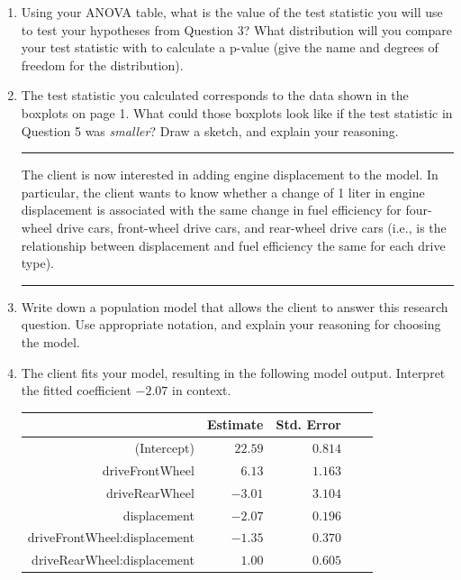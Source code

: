 \documentclass[11pt]{article}
\begin{document}
\begin{enumerate}
\pagebreak

\item Using your ANOVA table, what is the value of the test statistic you will use to test your hypotheses from Question 3? What distribution will you compare your test statistic with to calculate a p-value (give the name and degrees of freedom for the distribution).

\vspace{3cm}

\item The test statistic you calculated corresponds to the data shown in the boxplots on page 1. What could those boxplots look like if the test statistic in Question 5 was \textit{smaller}? Draw a sketch, and explain your reasoning.

\pagebreak

\rule{\textwidth}{1pt}

The client is now interested in adding engine displacement to the model. In particular, the client wants to know whether a change of 1 liter in engine displacement is associated with the same change in fuel efficiency for four-wheel drive cars, front-wheel drive cars, and rear-wheel drive cars (i.e., is the relationship between displacement and fuel efficiency the same for each drive type).

\rule{\textwidth}{1pt}

\item Write down a population model that allows the client to answer this research question. Use appropriate notation, and explain your reasoning for choosing the model.

\vspace{5cm}

\item The client fits your model, resulting in the following model output. Interpret the fitted coefficient $-2.07$ in context.

\begin{center}
\begin{tabular}{rrrrr}
  \hline
             & Estimate & Std. Error \\
  \hline
(Intercept)    & $22.59$ & $0.814$    \\
 driveFrontWheel    & $6.13$ & $1.163$ \\
 driveRearWheel & $-3.01$ & $3.104$ \\
 displacement & $-2.07$ & $0.196$ \\
 driveFrontWheel:displacement & $-1.35$ & $0.370$ \\
 driveRearWheel:displacement & $1.00$ & $0.605$ \\
  \hline
\end{tabular}
\end{center}


\end{enumerate}
\end{document}
